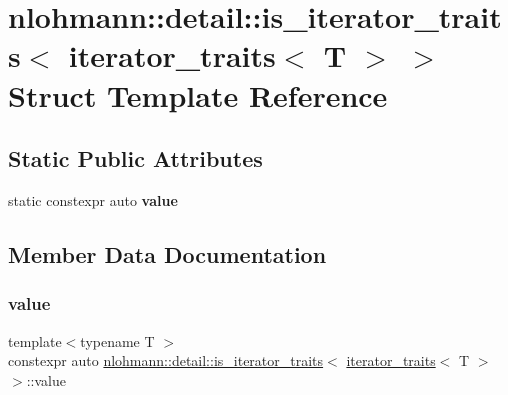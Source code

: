 \hypertarget{structnlohmann_1_1detail_1_1is__iterator__traits_3_01iterator__traits_3_01T_01_4_01_4}{}\section{nlohmann\+:\+:detail\+:\+:is\+\_\+iterator\+\_\+traits$<$ iterator\+\_\+traits$<$ T $>$ $>$ Struct Template Reference}
\label{structnlohmann_1_1detail_1_1is__iterator__traits_3_01iterator__traits_3_01T_01_4_01_4}
\subsection*{Static Public Attributes}
\begin{DoxyCompactItemize}
\item 
static constexpr auto {\bfseries value}
\end{DoxyCompactItemize}


\subsection{Member Data Documentation}
\mbox{\label{structnlohmann_1_1detail_1_1is__iterator__traits_3_01iterator__traits_3_01T_01_4_01_4_ac2711760b352b8921accc6609957dc90}} 
\subsubsection{\texorpdfstring{value}{value}}
{\footnotesize\ttfamily template$<$typename T $>$ \\
constexpr auto \hyperlink{structnlohmann_1_1detail_1_1is__iterator__traits}{nlohmann\+::detail\+::is\+\_\+iterator\+\_\+traits}$<$ \hyperlink{structnlohmann_1_1detail_1_1iterator__traits}{iterator\+\_\+traits}$<$ T $>$ $>$\+::value\hspace{0.3cm}{\ttfamily [static]}}

